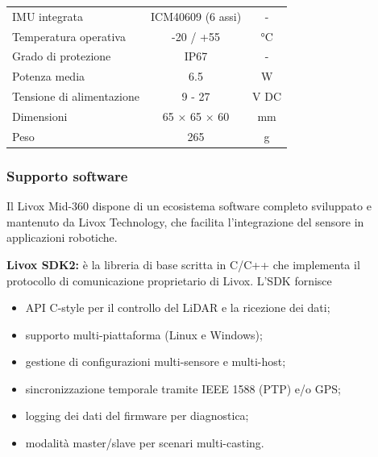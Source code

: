 \begin{table}[htbp]
\begin{tabular}{|l|c|c|}
        IMU integrata                                & ICM40609 (6 assi)                & -              \\
        Temperatura operativa                        & -20 / +55                        & °C             \\
        Grado di protezione                          & IP67                             & -              \\
        Potenza media                                & 6.5                              & W              \\
        Tensione di alimentazione                    & 9 - 27                           & V DC           \\
        Dimensioni                                   & 65 × 65 × 60                     & mm             \\
        Peso                                         & 265                              & g              \\
        \hline
    \end{tabular}
\end{table}

\subsubsection{Supporto software}
Il Livox Mid-360 dispone di un ecosistema software completo sviluppato e mantenuto da Livox Technology, che facilita l'integrazione del sensore in applicazioni robotiche.

\textbf{Livox SDK2:} è la libreria di base scritta in C/C++ che implementa il protocollo di comunicazione proprietario di Livox. L'SDK fornisce
\begin{itemize}
    \item API C-style per il controllo del LiDAR e la ricezione dei dati;
    \item supporto multi-piattaforma (Linux e Windows);
    \item gestione di configurazioni multi-sensore e multi-host;
    \item sincronizzazione temporale tramite IEEE 1588 (PTP) e/o GPS;
    \item logging dei dati del firmware per diagnostica;
    \item modalità master/slave per scenari multi-casting.
\end{itemize}

